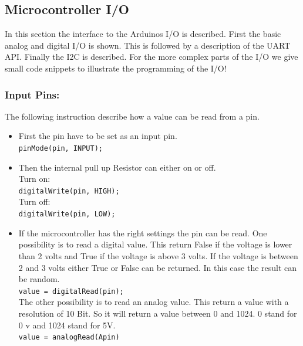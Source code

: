 \subsection{Microcontroller I/O} \label{sec:microcontrollerIO}
In this section the interface to the Arduinos I/O is described.
First the basic analog and digital I/O is shown.
This is followed by a description of the UART API. 
Finally the I2C is described.
For the more complex parts of the I/O we give small code snippets to illustrate the programming of the I/O!


\subsubsection{Input Pins:} \label{sec:inputPins}
The following instruction describe how a value can be read from a pin.
\begin{itemize}
\item First the pin have to be set as an input pin.\\
\lstinline|pinMode(pin, INPUT);|

\item Then the internal pull up Resistor can either on or off.\\
Turn on:\\
\lstinline|digitalWrite(pin, HIGH);|\\
Turn off:\\
\lstinline|digitalWrite(pin, LOW);|\\

\item If the microcontroller has the right settings the pin can be read.
One possibility is to read a digital value.
This return False if the voltage is lower than 2 volts and True if the voltage is above 3 volts.
If the voltage is between 2 and 3 volts either True or False can be returned.
In this case the result can be random.\\
\lstinline|value = digitalRead(pin);|\\
The other possibility is to read an analog value.
This return a value with a resolution of 10 Bit.
So it will return a value between 0 and 1024.
0 stand for 0 v and 1024 stand for 5V.\\
\lstinline|value = analogRead(Apin)|\\
\end{itemize}

